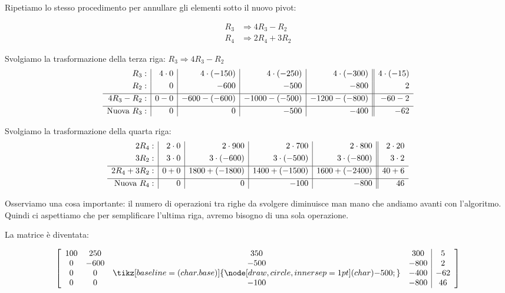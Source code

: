 Ripetiamo lo stesso procedimento per annullare gli elementi sotto il nuovo pivot:

\begin{equation}
\begin{aligned}
R_3 &\Rightarrow 4 R_3 - R_2 \\
R_4 &\Rightarrow 2 R_4 + 3 R_2
\end{aligned}
\end{equation}


Svolgiamo la trasformazione della terza riga: $R_3 \Rightarrow 4R_3 - R_2$
\[
\begin{array}{r | r | r | r | r || r}
R_3: & 4\cdot0 & 4\cdot(-150) & 4\cdot(-250) & 4\cdot(-300) & 4\cdot(-15) \\[1mm]
R_2: & 0 & -600 & -500 & -800 & 2 \\[1mm]
\hline
4R_3 - R_2: & 0-0 & -600-(-600) & -1000-(-500) & -1200-(-800) & -60-2 \\[1mm]
\hline
\text{Nuova }R_3: & 0 & 0 & -500 & -400 & -62
\end{array}
\]
\vspace{0.5cm}


Svolgiamo la trasformazione della quarta riga: 
\[
\begin{array}{r | r | r | r | r || r}
2R_4: & 2\cdot0 & 2\cdot900 & 2\cdot700 & 2\cdot800 & 2\cdot20 \\[1mm]
3R_2: & 3\cdot0 & 3\cdot(-600) & 3\cdot(-500) & 3\cdot(-800) & 3\cdot2 \\[1mm]
\hline
2R_4 + 3R_2: & 0+0 & 1800+(-1800) & 1400+(-1500) & 1600+(-2400) & 40+6 \\[1mm]
\hline
\text{Nuova }R_4: & 0 & 0 & -100 & -800 & 46
\end{array}
\]

Osserviamo una cosa importante: il numero di operazioni tra righe da svolgere diminuisce man mano che andiamo avanti con l'algoritmo. Quindi ci aspettiamo che per semplificare l'ultima riga, avremo bisogno di una sola operazione.

La matrice è diventata:

\begin{equation}
\left[
\begin{array}{cccc|c}
100 & 250 & 350 & 300 & 5 \\
0   & -600 & -500 & -800 & 2 \\
0   & 0 & \tikz[baseline=(char.base)]{\node[draw,circle,inner sep=1pt] (char) {-500};} & -400 & -62 \\
0   & 0  & -100  & -800  & 46
\end{array}
\right]
\label{mat: dopo secondo pivot}
\end{equation}

